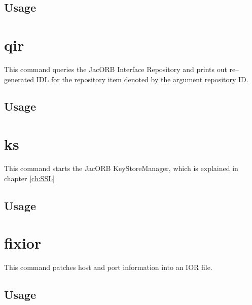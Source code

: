 \subsection*{Usage}


\section{qir}

This command queries the JacORB Interface Repository and prints out
re--generated IDL for the repository item denoted by the argument
repository ID.

\subsection*{Usage}


\section{ks}

This command starts the JacORB KeyStoreManager, which is explained in
chapter \ref{ch:SSL}

\subsection*{Usage}


\section{fixior}

This command patches host and port information into an IOR file.

\subsection*{Usage}



